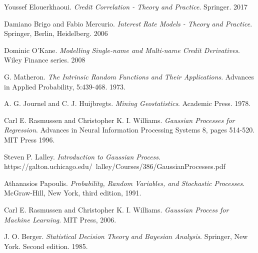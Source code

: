 \documentclass[11pt,a4paper]{article}
\theoremstyle{definition}
\numberwithin{equation}{section}
\begin{document}
\newpage
\begin{thebibliography}{11}
	
	Youssef Elouerkhaoui.
	\textit{Credit Correlation - Theory and Practice}. 
	Springer. 2017
	
	Damiano Brigo and Fabio Mercurio.
	\textit{Interest Rate Models - Theory and Practice}. 
	Springer, Berlin, Heidelberg. 2006
	
	Dominic O'Kane.
	\textit{Modelling Single-name and Multi-name Credit Derivatives}. 
	Wiley Finance series. 2008
	
	G. Matheron.
	\textit{The Intrinsic Random Functions and Their Applications}. 
	Advances in Applied Probability, 5:439-468. 1973.
	
	A. G. Journel and C. J. Huijbregts.
	\textit{Mining Geostatistics}. 
	Academic Press. 1978.
	
	Carl E. Rasmussen and Christopher K. I. Williams.
	\textit{Gaussian Processes for Regression}. 
	Advances in Neural Information Processing Systems 8, pages 514-520. MIT Press 1996.
	
	
	Steven P. Lalley.
	\textit{Introduction to Gaussian Process}. 
	https://galton.uchicago.edu/~lalley/Courses/386/GaussianProcesses.pdf
	
	Athanasios Papoulis.
	\textit{Probability, Random Variables, and Stochastic Processes}. 
	McGraw-Hill, New York, third edition, 1991.
	
	Carl E. Rasmussen and Christopher K. I. Williams.
	\textit{Gaussian Process for Machine Learning}. 
	MIT Press, 2006.
	
	J. O. Berger.
	\textit{Statistical Decision Theory and Bayesian Analysis}. 
	Springer, New York. Second edition. 1985. 
	

\end{thebibliography}
\end{document}

